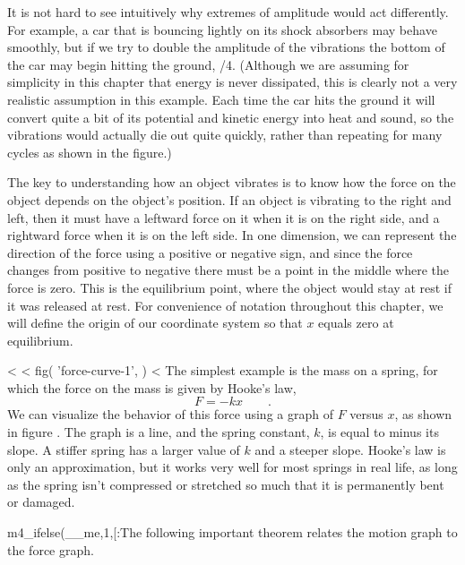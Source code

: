 It is not hard to see intuitively why extremes of amplitude
would act differently. For example, a car that is bouncing
lightly on its shock absorbers may behave smoothly, but if
we try to double the amplitude of the vibrations the bottom
of the car may begin hitting the ground, /4. (Although we
are assuming for simplicity in this chapter that energy is
never dissipated, this is clearly not a very realistic
assumption in this example. Each time the car hits the
ground it will convert quite a bit of its potential and
kinetic energy into heat and sound, so the vibrations would
actually die out quite quickly, rather than repeating for
many cycles as shown in the figure.)

The key to understanding how an object vibrates is to know
how the force on the object depends on the object's
position. If an object is vibrating to the right and left,
then it must have a leftward force on it when it is on the
right side, and a rightward force when it is on the left
side. In one dimension, we can represent the direction of
the force using a positive or negative sign, and since the
force changes from positive to negative there must be a
point in the middle where the force is zero. This is the
equilibrium point, where the object would stay at rest if it
was released at rest. For convenience of notation throughout
this chapter, we will define the origin of our coordinate
system so that $x$ equals zero at equilibrium.

<%
<%
  fig(
    'force-curve-1',
  )
<%
The simplest example is the mass on a spring, for which the
force on the mass is given by Hooke's law,
\begin{equation*}
                F    =    -kx   \qquad   .
\end{equation*}
We can visualize the behavior of this force using a graph of
$F$ versus $x$, as shown in figure . The graph is a line, and the
spring constant, $k$, is equal to minus its slope.
A stiffer
spring has a larger value of $k$ and a steeper slope.
Hooke's law is only an approximation, but it works very well
for most springs in real life, as long as the spring isn't
compressed or stretched so much that it is permanently bent or damaged.

m4_ifelse(__me,1,[:The following important theorem relates the motion graph to the force graph.

